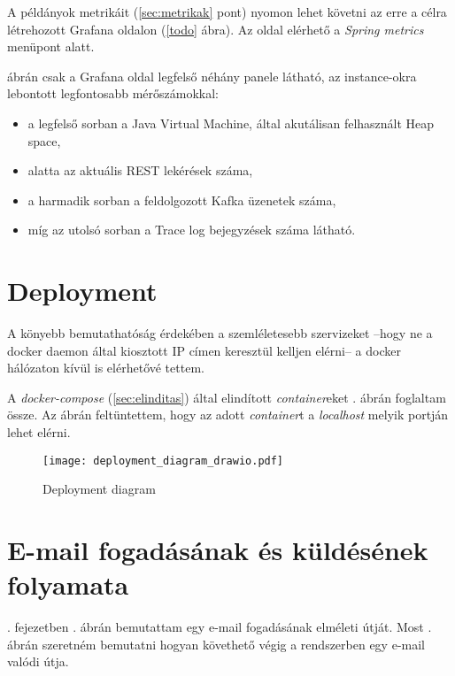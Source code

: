 A példányok metrikáit (\ref{sec:metrikak} pont) nyomon lehet követni az erre a célra létrehozott Grafana oldalon (\ref{todo} ábra). Az oldal elérhető a  \textit{Spring metrics} menüpont alatt.

 ábrán csak a Grafana oldal legfelső néhány panele látható, az instance-okra lebontott legfontosabb mérőszámokkal:

\begin{itemize}
	\item a legfelső sorban a Java Virtual Machine, által akutálisan felhasznált Heap space,	
	\item alatta az aktuális REST lekérések száma,
	\item a harmadik sorban a feldolgozott Kafka üzenetek száma,
	\item míg az utolsó sorban a Trace log bejegyzések száma látható.
\end{itemize}


\section{Deployment}
A könyebb bemutathatóság érdekében a szemléletesebb szervizeket --hogy ne a docker daemon által kiosztott IP címen keresztül kelljen elérni-- a docker hálózaton kívül is elérhetővé tettem. 

A \textit{docker-compose} (\ref{sec:elinditas}) által elindított \textit{container}eket . ábrán foglaltam össze. Az ábrán feltüntettem, hogy az adott \textit{container}t a \textit{localhost} melyik portján lehet elérni.


\begin{figure}[hbt] 
	\centering
	\texttt{[image: deployment\_diagram\_drawio.pdf]}
	\caption[Deployment diagram]{Deployment diagram}
	\label{fig:deployment_diagram}
\end{figure}


\section{E-mail fogadásának és küldésének folyamata}
. fejezetben . ábrán bemutattam egy e-mail fogadásának elméleti útját. Most . ábrán szeretném bemutatni hogyan követhető végig a rendszerben egy e-mail valódi útja.

